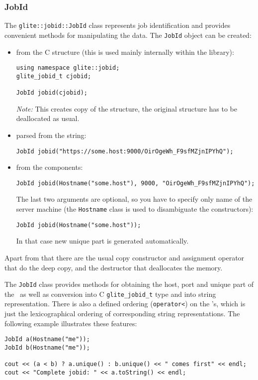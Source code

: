 \subsubsection{JobId}
The \verb'glite::jobid::JobId' class represents job identification and
provides convenient methods for manipulating the data. The
\verb'JobId' object can be created:
\begin{itemize}
\item from the C structure (this is used mainly internally within the
library):
\begin{lstlisting}
using namespace glite::jobid;
glite_jobid_t cjobid;

JobId jobid(cjobid);
\end{lstlisting}
\emph{Note:} This creates copy of the structure, the original structure has to be
deallocated as usual.
\item parsed from the string:
\begin{lstlisting}
JobId jobid("https://some.host:9000/OirOgeWh_F9sfMZjnIPYhQ");
\end{lstlisting}
\item from the components:
\begin{lstlisting}
JobId jobid(Hostname("some.host"), 9000, "OirOgeWh_F9sfMZjnIPYhQ");
\end{lstlisting}
The last two arguments are optional, so you have to specify only
name of the \LB server machine (the \verb'Hostname' class is used to
disambiguate the constructors):
\begin{lstlisting}
JobId jobid(Hostname("some.host"));
\end{lstlisting}
In that case new unique part is generated automatically.
\end{itemize}
Apart from that there are the usual copy constructor and assignment
operator that do the deep copy, and the destructor that deallocates
the memory.

%
The \verb'JobId' class provides methods for obtaining the host, port
and unique part of the \jobid\ as well as conversion into C
\verb'glite_jobid_t' type and into string representation. There is
also a defined ordering (\verb'operator<') on the \jobid's, which is just the
lexicographical ordering of corresponding string
representations. The following example illustrates these features:

\begin{lstlisting}
JobId a(Hostname("me"));
JobId b(Hostname("me"));

cout << (a < b) ? a.unique() : b.unique() << " comes first" << endl;
cout << "Complete jobid: " << a.toString() << endl;
\end{lstlisting}

